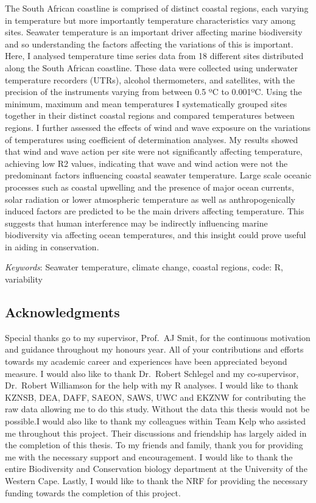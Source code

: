 \documentclass[12pt,a4paper,]{article}
\begin{document}
The South African coastline is comprised of distinct coastal regions,
each varying in temperature but more importantly temperature
characteristics vary among sites. Seawater temperature is an important
driver affecting marine biodiversity and so understanding the factors
affecting the variations of this is important. Here, I analysed
temperature time series data from 18 different sites distributed along
the South African coastline. These data were collected using underwater
temperature recorders (UTRs), alcohol thermometers, and satellites, with
the precision of the instruments varying from between 0.5 ºC to 0.001ºC.
Using the minimum, maximum and mean temperatures I systematically
grouped sites together in their distinct coastal regions and compared
temperatures between regions. I further assessed the effects of wind and
wave exposure on the variations of temperatures using coefficient of
determination analyses. My results showed that wind and wave action per
site were not significantly affecting temperature, achieving low R2
values, indicating that wave and wind action were not the predominant
factors influencing coastal seawater temperature. Large scale oceanic
processes such as coastal upwelling and the presence of major ocean
currents, solar radiation or lower atmospheric temperature as well as
anthropogenically induced factors are predicted to be the main drivers
affecting temperature. This suggests that human interference may be
indirectly influencing marine biodiversity via affecting ocean
temperatures, and this insight could prove useful in aiding in
conservation.

\emph{Keywords}: Seawater temperature, climate change, coastal regions,
code: R, variability

\newpage

\hypertarget{acknowledgments}{%
\subsection{Acknowledgments}\label{acknowledgments}}

Special thanks go to my supervisor, Prof.~AJ Smit, for the continuous
motivation and guidance throughout my honours year. All of your
contributions and efforts towards my academic career and experiences
have been appreciated beyond measure. I would also like to thank
Dr.~Robert Schlegel and my co-supervisor, Dr.~Robert Williamson for the
help with my R analyses. I would like to thank KZNSB, DEA, DAFF, SAEON,
SAWS, UWC and EKZNW for contributing the raw data allowing me to do this
study. Without the data this thesis would not be possible.I would also
like to thank my colleagues within Team Kelp who assisted me throughout
this project. Their discussions and friendship has largely aided in the
completion of this thesis. To my friends and family, thank you for
providing me with the necessary support and encouragement. I would like
to thank the entire Biodiversity and Conservation biology department at
the University of the Western Cape. Lastly, I would like to thank the
NRF for providing the necessary funding towards the completion of this
project.
\end{document}
